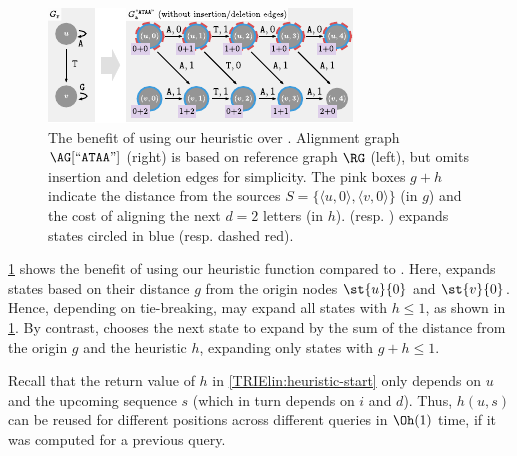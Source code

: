 \begin{figure}[t]
	\centering
	\includegraphics[width=0.9\columnwidth]{figs/heuristic}
	\caption{The benefit of using our heuristic over \dijkstra. Alignment graph
	$\AG[``\texttt{ATAA}"]$ (right) is based on reference graph $\RG$ (left),
	but omits insertion and deletion edges for simplicity. The pink boxes $g+h$
	indicate the distance from the sources $S=\{\langle u,0 \rangle, \langle v,0
	\rangle \}$ (in $g$) and the cost of aligning the next $d=2$ letters (in
	$h$). \dijkstra (resp. \A) expands states circled in
	\textcolor{my-full-blue}{blue} (resp.
	\textcolor{my-full-red}{dashed red}).}
	\label{TRIEfig:heuristic-benefit}
\end{figure}

 \label{TRIEpara:heuristic-benefits}
\cref{TRIEfig:heuristic-benefit} shows the benefit of using our heuristic function
compared to \dijkstra. Here, \dijkstra expands states based on their distance
$g$ from the origin nodes $\st{u}{0}$ and $\st{v}{0}$. Hence, depending on
tie-breaking, \dijkstra may expand all states with $h \leq 1$, as shown in
\cref{TRIEfig:heuristic-benefit}. By contrast, \A chooses the next state to expand
by the sum of the distance from the origin $g$ and the heuristic $h$, expanding
only states with $g+h \leq 1$.

 \label{TRIEpara:memoization}
Recall that the return value of $h$ in \cref{TRIElin:heuristic-start} only depends
on $u$ and the upcoming sequence $s$ (which in turn depends on $i$ and $d$).
Thus, $h(u,s)$ can be reused for different positions across different queries in
$\Oh(1)$ time, if it was computed for a previous query.